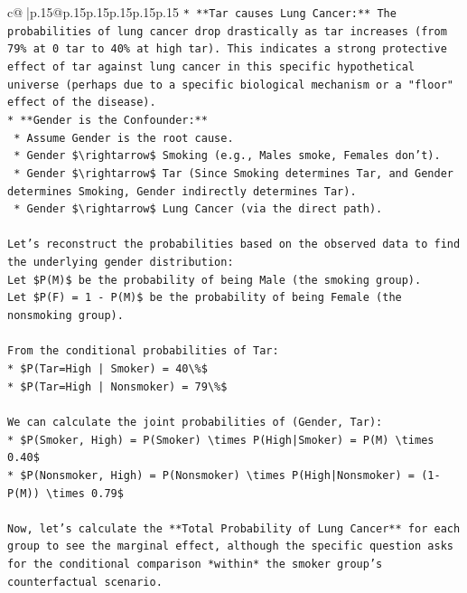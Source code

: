 \documentclass{article}
\begin{document}
{\begin{supertabular}{c@{$\;$}|p{.15\linewidth}@{}p{.15\linewidth}p{.15\linewidth}p{.15\linewidth}p{.15\linewidth}p{.15\linewidth}}
{{{\texttt{*   **Tar causes Lung Cancer:** The probabilities of lung cancer drop drastically as tar increases (from 79\% at 0 tar to 40\% at high tar). This indicates a strong protective effect of tar against lung cancer in this specific hypothetical universe (perhaps due to a specific biological mechanism or a "floor" effect of the disease).} \\
\texttt{*   **Gender is the Confounder:**} \\
\texttt{    *   Assume Gender is the root cause.} \\
\texttt{    *   Gender \$\textbackslash{}rightarrow\$ Smoking (e.g., Males smoke, Females don't).} \\
\texttt{    *   Gender \$\textbackslash{}rightarrow\$ Tar (Since Smoking determines Tar, and Gender determines Smoking, Gender indirectly determines Tar).} \\
\texttt{    *   Gender \$\textbackslash{}rightarrow\$ Lung Cancer (via the direct path).} \\
\\ 
\texttt{Let's reconstruct the probabilities based on the observed data to find the underlying gender distribution:} \\
\texttt{Let \$P(M)\$ be the probability of being Male (the smoking group).} \\
\texttt{Let \$P(F) = 1 {-} P(M)\$ be the probability of being Female (the nonsmoking group).} \\
\\ 
\texttt{From the conditional probabilities of Tar:} \\
\texttt{*   \$P(Tar=High | Smoker) = 40\textbackslash{}\%\$} \\
\texttt{*   \$P(Tar=High | Nonsmoker) = 79\textbackslash{}\%\$} \\
\\ 
\texttt{We can calculate the joint probabilities of (Gender, Tar):} \\
\texttt{*   \$P(Smoker, High) = P(Smoker) \textbackslash{}times P(High|Smoker) = P(M) \textbackslash{}times 0.40\$} \\
\texttt{*   \$P(Nonsmoker, High) = P(Nonsmoker) \textbackslash{}times P(High|Nonsmoker) = (1{-}P(M)) \textbackslash{}times 0.79\$} \\
\\ 
\texttt{Now, let's calculate the **Total Probability of Lung Cancer** for each group to see the marginal effect, although the specific question asks for the conditional comparison *within* the smoker group's counterfactual scenario.} \\
}}}
\end{supertabular}}
\end{document}
